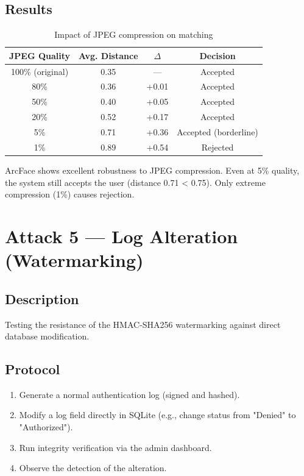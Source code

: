 \subsection{Results}

\begin{table}[H]
    \centering
    \begin{tabular}{cccc}
        \toprule
        \textbf{JPEG Quality} & \textbf{Avg. Distance} & \textbf{$\Delta$} & \textbf{Decision} \\
        \midrule
        100\% (original) & 0.35 & ---   & Accepted \\
        80\%             & 0.36 & +0.01 & Accepted \\
        50\%             & 0.40 & +0.05 & Accepted \\
        20\%             & 0.52 & +0.17 & Accepted \\
        5\%              & 0.71 & +0.36 & Accepted (borderline) \\
        1\%              & 0.89 & +0.54 & Rejected \\
        \bottomrule
    \end{tabular}
    \caption{Impact of JPEG compression on matching}
\end{table}

\begin{successbox}[Analysis]
ArcFace shows excellent robustness to JPEG compression. Even at 5\% quality, the system still accepts the user (distance 0.71 < 0.75). Only extreme compression (1\%) causes rejection.
\end{successbox}

\section{Attack 5 — Log Alteration (Watermarking)}

\subsection{Description}

Testing the resistance of the HMAC-SHA256 watermarking against direct database modification.

\subsection{Protocol}

\begin{enumerate}
    \item Generate a normal authentication log (signed and hashed).
    \item Modify a log field directly in SQLite (e.g., change status from "Denied" to "Authorized").
    \item Run integrity verification via the admin dashboard.
    \item Observe the detection of the alteration.
\end{enumerate}

